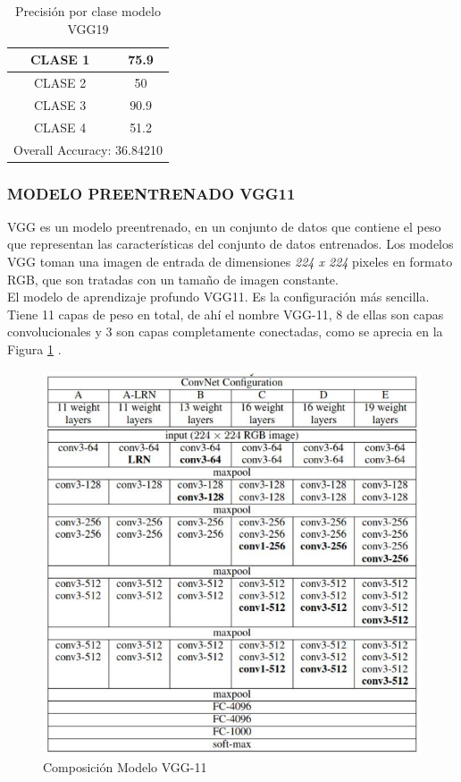 			\begin{table}[htbp]
				\centering
				\begin{tabular}{|c|c|}
					\hline
					CLASE 1 & 75.9 \bigstrut\\
					\hline
					CLASE 2 & 50 \bigstrut\\
					\hline
					CLASE 3 & 90.9 \bigstrut\\
					\hline
					CLASE 4 & 51.2 \bigstrut\\
					\hline
					\multicolumn{2}{|c|}{Overall Accuracy: 36.84210} \bigstrut\\
					\hline
				\end{tabular}%
				\caption{Precisión por clase modelo VGG19}
				\label{fig:ACU_VGG19}
			\end{table}%
		
		
			\newpage
			\subsubsection{\MakeUppercase{Modelo preentrenado VGG11}}
			VGG es un modelo preentrenado, en un conjunto de datos que contiene el peso que representan las características del conjunto de datos entrenados. Los modelos VGG toman una imagen de entrada de dimensiones \textit{224 x 224} pixeles en formato RGB, que son tratadas con un tamaño de imagen constante.\\
			
			
			 El modelo de aprendizaje profundo VGG11. Es la configuración más sencilla. Tiene 11 capas de peso en total, de ahí el nombre VGG-11, 8 de ellas son capas convolucionales y 3 son capas completamente conectadas, como se aprecia en la Figura \ref{fig:VGG11} \cite{ref_3}.
			
			\begin{figure}[ht]
				\centering
				\includegraphics[scale=0.6]{Figs/70.png}
				\caption{Composición Modelo VGG-11}
				\label{fig:VGG11}
			\end{figure}
		
